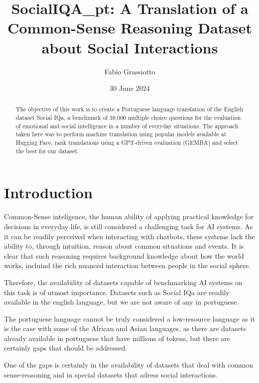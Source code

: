 \documentclass{article}
\title{SocialIQA\_pt: A Translation of a Common-Sense Reasoning Dataset about Social Interactions}
\author{Fabio Grassiotto}
\date{30 June 2024}
\begin{document}
\maketitle

\begin{abstract}
    The objective of this work is to create a Portuguese language translation of
    the English dataset Social IQa, a benchmark of 38,000 multiple choice
    questions for the evaluation of emotional and social intelligence in a
    number of everyday situations. The approach taken here was to perform
    machine translation using popular models available at Hugging Face, rank
    translations using a GPT-driven evaluation (GEMBA) and select the best for
    our dataset.
\end{abstract}

\section{Introduction}

Common-Sense inteligence, the human ability of applying practical knowledge for
decisions in everyday life, is still considered a challenging task for AI
systems. As it can be readily perceived when interacting with chatbots, these
systems lack the ability to, through intuition, reason about common situations
and events. It is clear that such reasoning requires background knowledge about
how the world works, incluind the rich nuanced interaction between people in the
social sphere. \cite{choi2022curious, krause2023commonsense}

Therefore, the availability of datasets capable of benchmarking AI systems on
this task is of utmost importance. Datasets such as Social IQa are readily
available in the english language, but we are not aware of any in portuguese.
\cite{sap2019socialiqa}

The portuguese language cannot be truly considered a low-resource language as
it is the case with some of the African and Asian languages, as there are
datasets already available in portuguese that have millions of tokens, but there
are certainly gaps that should be addressed. \cite{ghafoor2021impact}

One of the gaps is certainly in the availability of datasets that deal with
common sense-reasoning and in special datasets that adress social interactions.
\end{document}
